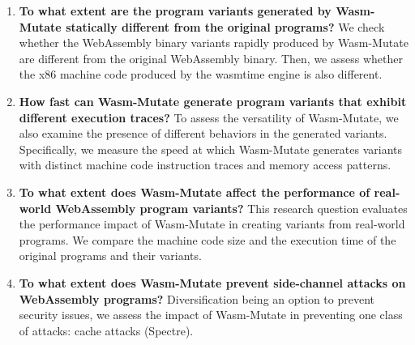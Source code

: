 \documentclass[a4paper,fleqn]{cas-dc}
\newcommand{\tool}{{\sc Wasm-Mutate}\xspace}
\newcommand{\Wasm}{WebAssembly\xspace}
\newcommand{\wasm}{\Wasm}
\newenvironment{revision1}{\color{blue}}{}
\begin{document}
\newcommand\rqstatic{To what extent are the program variants generated by \tool statically different from the original programs?\xspace}

\newcommand\rqdynamic{How fast can \tool generate program variants that exhibit different execution traces?\xspace}

\newcommand\rqdefensive{To what extent does \tool prevent side-channel attacks on \Wasm programs?\xspace}


\newcommand\rqperformance{To what extent does \tool affect the performance of real-world \Wasm program variants?\xspace}


\newcommand\rqtesting{To what extent can \tool be used to perform differential testing of \Wasm tools?\xspace}

\newcommand{\nProgramsRosetta}{303\xspace}


\newcommand{\DTWStatic}{\ensuremath{\mathit{dt\_static}\xspace}}
\newcommand{\DTWDynamic}{\ensuremath{\mathit{dt\_dy}\xspace}}

\begin{enumerate}[label=RQ\arabic*:, ref=RQ\arabic*]
     \item \label{rq:static} \textbf{\rqstatic}
        We check whether the \wasm binary variants rapidly produced by \tool are different from the original \wasm binary. Then, we assess whether the x86 machine code produced by the wasmtime engine is also different.
    
    \item \label{rq:dynamic}\textbf{\rqdynamic}
    To assess the versatility of \tool, we also examine the presence of different behaviors in the generated variants. 
    Specifically, we measure the speed at which \tool generates variants with distinct machine code instruction traces and memory access patterns.
    
        

     \begin{revision1}
        \item \label{rq:performance}\textbf{\rqperformance} This research question evaluates the performance impact of \tool in creating variants from real-world programs. We compare the machine code size and the execution time of the original programs and their variants.
     \end{revision1}
     
    \item \label{rq:defensive}\textbf{\rqdefensive} Diversification being an option to prevent security issues,  we assess the impact of \tool in preventing one class of attacks: cache attacks (Spectre).

        
\end{enumerate}
\end{document}

